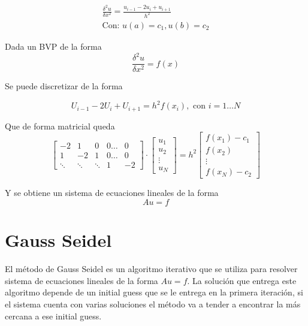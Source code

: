 \documentclass[letter, 10pt]{article}
\begin{document}
\begin{align}
     \frac{\delta^2 u}{\delta x^2} = \frac{u_{i-1} - 2 u_i + u_{i+1}}{h^2} \\
     \text{Con: }  u(a) = c_1, u(b) = c_2
\end{align}

Dada un BVP de la forma
\begin{equation}
  \frac{\delta^2 u}{\delta x^2} = f(x)   
\end{equation}

Se puede discretizar de la forma

\begin{equation}
  U_{i-1} - 2 U_i + U_{i+1} = h^2 f(x_i), \text{ con } i=1\dots N
\end{equation}

Que de forma matricial queda
\begin{equation}
    \begin{bmatrix}
        -2      & 1 & 0 & 0 \dots & 0 \\
        1       & -2 & 1 & 0 \dots & 0\\
        \ddots & \ddots & \ddots & 1 &-2
      
    \end{bmatrix}
    \cdot
    \begin{bmatrix}
       u_1 \\
       u_2 \\
       \vdots \\
       u_N
    \end{bmatrix}
    =
    h^2
    \begin{bmatrix}
    f(x_1) - c_1 \\
    f(x_2) \\
    \vdots \\
    f(x_N) - c_2
    \end{bmatrix}  
\end{equation}

Y se obtiene un sistema de ecuaciones lineales de la forma
\begin{equation}
    Au = f
\end{equation}

\section{Gauss Seidel}
El método de Gauss Seidel \cite{briggs2000multigrid} es un algoritmo iterativo que se utiliza para resolver sistema de ecuaciones lineales de la forma $Au = f$. La solución que entrega este algoritmo depende de un initial guess que se le entrega en la primera iteración, si el sistema cuenta con varias soluciones el método va a tender a encontrar la más cercana a ese initial guess.
\end{document}
